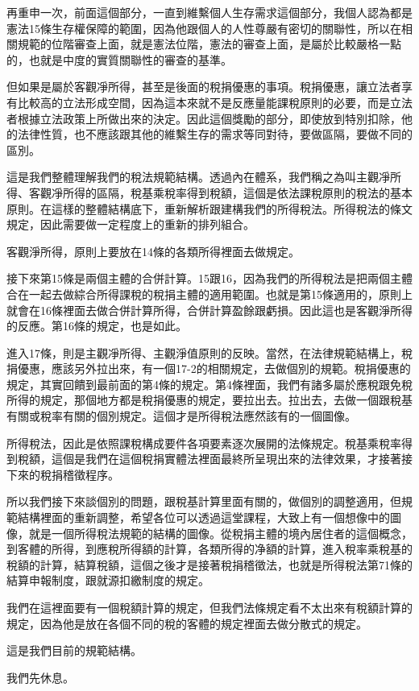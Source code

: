 \documentclass[]{ctexbook}
\begin{document}
再重申一次，前面這個部分，一直到維繫個人生存需求這個部分，我個人認為都是憲法15條生存權保障的範圍，因為他跟個人的人性尊嚴有密切的關聯性，所以在相關規範的位階審查上面，就是憲法位階，憲法的審查上面，是屬於比較嚴格一點的，也就是中度的實質關聯性的審查的基準。

但如果是屬於客觀凈所得，甚至是後面的稅捐優惠的事項。稅捐優惠，讓立法者享有比較高的立法形成空間，因為這本來就不是反應量能課稅原則的必要，而是立法者根據立法政策上所做出來的決定。因此這個獎勵的部分，即使放到特別扣除，他的法律性質，也不應該跟其他的維繫生存的需求等同對待，要做區隔，要做不同的區別。

這是我們整體理解我們的稅法規範結構。透過內在體系，我們稱之為叫主觀凈所得、客觀凈所得的區隔，稅基乘稅率得到稅額，這個是依法課稅原則的稅法的基本原則。在這樣的整體結構底下，重新解析跟建構我們的所得稅法。所得稅法的條文規定，因此需要做一定程度上的重新的排列組合。

客觀淨所得，原則上要放在14條的各類所得裡面去做規定。

接下來第15條是兩個主體的合併計算。15跟16，因為我們的所得稅法是把兩個主體合在一起去做綜合所得課稅的稅捐主體的適用範圍。也就是第15條適用的，原則上就會在16條裡面去做合併計算所得，合併計算盈餘跟虧損。因此這也是客觀淨所得的反應。第16條的規定，也是如此。

進入17條，則是主觀凈所得、主觀淨值原則的反映。當然，在法律規範結構上，稅捐優惠，應該另外拉出來，有一個17-2的相關規定，去做個別的規範。稅捐優惠的規定，其實回饋到最前面的第4條的規定。第4條裡面，我們有諸多屬於應稅跟免稅所得的規定，那個地方都是稅捐優惠的規定，要拉出去。拉出去，去做一個跟稅基有關或稅率有關的個別規定。這個才是所得稅法應然該有的一個圖像。

所得稅法，因此是依照課稅構成要件各項要素逐次展開的法條規定。稅基乘稅率得到稅額，這個是我們在這個稅捐實體法裡面最終所呈現出來的法律效果，才接著接下來的稅捐稽徵程序。

所以我們接下來談個別的問題，跟稅基計算里面有關的，做個別的調整適用，但規範結構裡面的重新調整，希望各位可以透過這堂課程，大致上有一個想像中的圖像，就是一個所得稅法規範的結構的圖像。從稅捐主體的境內居住者的這個概念，到客體的所得，到應稅所得額的計算，各類所得的净額的計算，進入稅率乘稅基的稅額的計算，結算稅額，這個之後才是接著稅捐稽徵法，也就是所得稅法第71條的結算申報制度，跟就源扣繳制度的規定。

我們在這裡面要有一個稅額計算的規定，但我們法條規定看不太出來有稅額計算的規定，因為他是放在各個不同的稅的客體的規定裡面去做分散式的規定。

這是我們目前的規範結構。

我們先休息。
\end{document}
